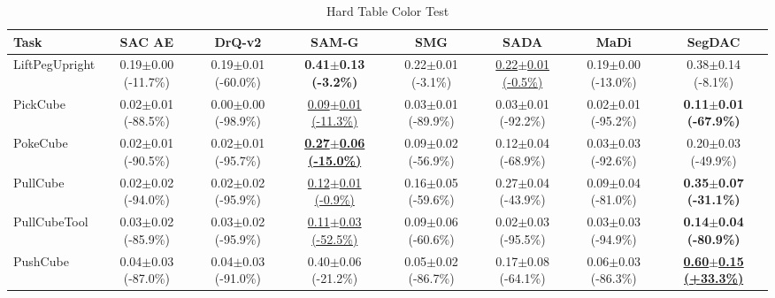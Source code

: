 \begin{table}[htbp]
\centering
\scriptsize
\caption{Hard Table Color Test}
\label{tab:appendix_tablecolortest_hard}
\begin{adjustbox}{max width=\textwidth}
\begin{tabular}{l*{7}{c}}
\toprule
\textbf{Task} & \textbf{SAC AE} & \textbf{DrQ-v2} & \textbf{SAM-G} & \textbf{SMG} & \textbf{SADA} & \textbf{MaDi} & \textbf{SegDAC} \\
\midrule
LiftPegUpright & 0.19$\pm$0.00 \scriptsize{(-11.7\%)} & 0.19$\pm$0.01 \scriptsize{(-60.0\%)} & \textbf{0.41$\pm$0.13 \scriptsize{(-3.2\%)}} & 0.22$\pm$0.01 \scriptsize{(-3.1\%)} & \underline{0.22$\pm$0.01 \scriptsize{(-0.5\%)}} & 0.19$\pm$0.00 \scriptsize{(-13.0\%)} & 0.38$\pm$0.14 \scriptsize{(-8.1\%)} \\
PickCube & 0.02$\pm$0.01 \scriptsize{(-88.5\%)} & 0.00$\pm$0.00 \scriptsize{(-98.9\%)} & \underline{0.09$\pm$0.01 \scriptsize{(-11.3\%)}} & 0.03$\pm$0.01 \scriptsize{(-89.9\%)} & 0.03$\pm$0.01 \scriptsize{(-92.2\%)} & 0.02$\pm$0.01 \scriptsize{(-95.2\%)} & \textbf{0.11$\pm$0.01 \scriptsize{(-67.9\%)}} \\
PokeCube & 0.02$\pm$0.01 \scriptsize{(-90.5\%)} & 0.02$\pm$0.01 \scriptsize{(-95.7\%)} & \textbf{\underline{0.27$\pm$0.06 \scriptsize{(-15.0\%)}}} & 0.09$\pm$0.02 \scriptsize{(-56.9\%)} & 0.12$\pm$0.04 \scriptsize{(-68.9\%)} & 0.03$\pm$0.03 \scriptsize{(-92.6\%)} & 0.20$\pm$0.03 \scriptsize{(-49.9\%)} \\
PullCube & 0.02$\pm$0.02 \scriptsize{(-94.0\%)} & 0.02$\pm$0.02 \scriptsize{(-95.9\%)} & \underline{0.12$\pm$0.01 \scriptsize{(-0.9\%)}} & 0.16$\pm$0.05 \scriptsize{(-59.6\%)} & 0.27$\pm$0.04 \scriptsize{(-43.9\%)} & 0.09$\pm$0.04 \scriptsize{(-81.0\%)} & \textbf{0.35$\pm$0.07 \scriptsize{(-31.1\%)}} \\
PullCubeTool & 0.03$\pm$0.02 \scriptsize{(-85.9\%)} & 0.03$\pm$0.02 \scriptsize{(-95.9\%)} & \underline{0.11$\pm$0.03 \scriptsize{(-52.5\%)}} & 0.09$\pm$0.06 \scriptsize{(-60.6\%)} & 0.02$\pm$0.03 \scriptsize{(-95.5\%)} & 0.03$\pm$0.03 \scriptsize{(-94.9\%)} & \textbf{0.14$\pm$0.04 \scriptsize{(-80.9\%)}} \\
PushCube & 0.04$\pm$0.03 \scriptsize{(-87.0\%)} & 0.04$\pm$0.03 \scriptsize{(-91.0\%)} & 0.40$\pm$0.06 \scriptsize{(-21.2\%)} & 0.05$\pm$0.02 \scriptsize{(-86.7\%)} & 0.17$\pm$0.08 \scriptsize{(-64.1\%)} & 0.06$\pm$0.03 \scriptsize{(-86.3\%)} & \textbf{\underline{0.60$\pm$0.15 \scriptsize{(+33.3\%)}}} \\

\end{tabular}
\end{adjustbox}
\end{table}
